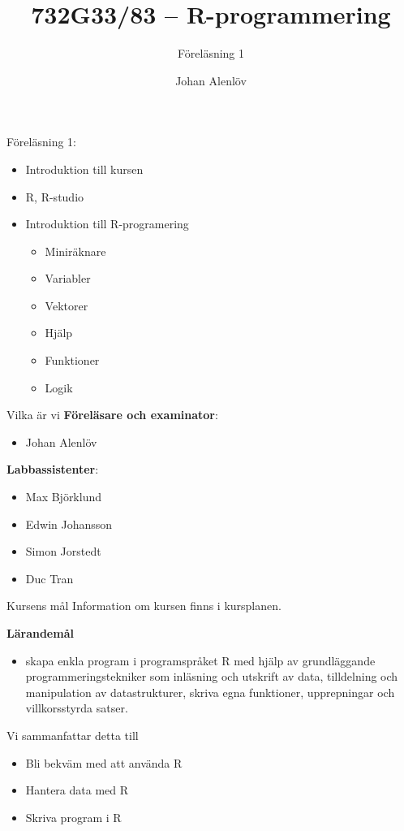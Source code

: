 \documentclass[
  10pt,
  ignorenonframetext,
]{beamer}
\title{732G33/83 -- R-programmering}
\subtitle{Föreläsning 1}
\author{Johan Alenlöv}
\date{}
\institute{Linköpings Universitet}
\providecommand{\tightlist}{%
  \setlength{\itemsep}{0pt}\setlength{\parskip}{0pt}}
\begin{document}
\frame{\titlepage}

\begin{frame}{Föreläsning 1:}
\protect\hypertarget{fuxf6reluxe4sning-1}{}
\begin{itemize}
\tightlist
\item
  Introduktion till kursen
\item
  R, R-studio
\item
  Introduktion till R-programering

  \begin{itemize}
  \tightlist
  \item
    Miniräknare
  \item
    Variabler
  \item
    Vektorer
  \item
    Hjälp
  \item
    Funktioner
  \item
    Logik
  \end{itemize}
\end{itemize}
\end{frame}

\begin{frame}{Vilka är vi}
\protect\hypertarget{vilka-uxe4r-vi}{}
\textbf{Föreläsare och examinator}:

\begin{itemize}
\tightlist
\item
  Johan Alenlöv
\end{itemize}

\textbf{Labbassistenter}:

\begin{itemize}
\tightlist
\item
  Max Björklund
\item
  Edwin Johansson
\item
  Simon Jorstedt
\item
  Duc Tran
\end{itemize}
\end{frame}

\begin{frame}{Kursens mål}
\protect\hypertarget{kursens-muxe5l}{}
Information om kursen finns i kursplanen.

\textbf{Lärandemål}

\begin{itemize}
\tightlist
\item
  skapa enkla program i programspråket R med hjälp av grundläggande
  programmeringstekniker som inläsning och utskrift av data, tilldelning
  och manipulation av datastrukturer, skriva egna funktioner,
  upprepningar och villkorsstyrda satser.
\end{itemize}

\pause Vi sammanfattar detta till

\begin{itemize}
\tightlist
\item
  Bli bekväm med att använda R
\item
  Hantera data med R
\item
  Skriva program i R
\end{itemize}
\end{frame}
\end{document}

